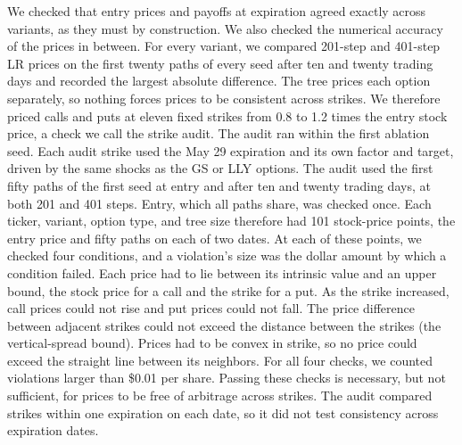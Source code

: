 We checked that entry prices and payoffs at expiration agreed exactly across variants, as they must by construction. We also checked the numerical accuracy of the prices in between. For every variant, we compared 201-step and 401-step LR prices on the first twenty paths of every seed after ten and twenty trading days and recorded the largest absolute difference. The tree prices each option separately, so nothing forces prices to be consistent across strikes. We therefore priced calls and puts at eleven fixed strikes from 0.8 to 1.2 times the entry stock price, a check we call the strike audit. The audit ran within the first ablation seed. Each audit strike used the May 29 expiration and its own factor and target, driven by the same shocks as the GS or LLY options. The audit used the first fifty paths of the first seed at entry and after ten and twenty trading days, at both 201 and 401 steps. Entry, which all paths share, was checked once. Each ticker, variant, option type, and tree size therefore had 101 stock-price points, the entry price and fifty paths on each of two dates. At each of these points, we checked four conditions, and a violation's size was the dollar amount by which a condition failed. Each price had to lie between its intrinsic value and an upper bound, the stock price for a call and the strike for a put. As the strike increased, call prices could not rise and put prices could not fall. The price difference between adjacent strikes could not exceed the distance between the strikes (the vertical-spread bound). Prices had to be convex in strike, so no price could exceed the straight line between its neighbors. For all four checks, we counted violations larger than \$0.01 per share. Passing these checks is necessary, but not sufficient, for prices to be free of arbitrage across strikes. The audit compared strikes within one expiration on each date, so it did not test consistency across expiration dates.



